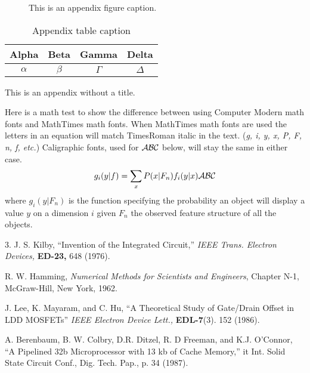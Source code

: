 \documentclass{book}
\begin{document}
\begin{figure}[ht]
\caption{This is an appendix figure caption.}
\end{figure}


\begin{table}[ht]
\caption{Appendix table caption}
\centering
\begin{tabular}{cccc}
\hline
Alpha&Beta&Gamma&Delta\\
\hline
$\alpha$&$\beta$&$\Gamma$&$\Delta$\\
\hline
\end{tabular}
\end{table}


\appendix{}
This is an appendix without a title.

Here is a math test to show the difference between using Computer Modern
math fonts and MathTimes math fonts. When MathTimes math fonts are used
the letters in an equation will match TimesRoman italic in the text.
({\it g, i, y, x, P, F, n, f, etc.}) Caligraphic fonts, used for
$\cal ABC$ below, will stay the same
in either case.
\begin{equation}
g_i(y|f)=\sum_x P(x|F_n)f_i(y|x){\cal ABC}
\end{equation}
where $g_i(y|F_n)$ is the function specifying the probability an object will
display a value $y$ on a dimension $i$ given $F_n$ the observed feature
structure of all the objects.



\begin{references}{3.}
J. S. Kilby,
``Invention of the Integrated Circuit,'' {\it IEEE Trans. Electron Devices,}
{\bf ED-23,} 648 (1976).

R. W. Hamming,
                 {\it Numerical Methods for Scientists and 
                 Engineers}, Chapter N-1, McGraw-Hill, 
                 New York, 1962.

J. Lee, K. Mayaram, and C. Hu, ``A Theoretical
               Study of Gate/Drain Offset in LDD MOSFETs''
                     {\it IEEE Electron Device Lett.,} {\bf EDL-7}(3). 152 
                     (1986).

A. Berenbaum, 
B. W. Colbry, D.R. Ditzel, R. D Freeman, and 
K.J. O'Connor, ``A Pipelined 32b Microprocessor with 13 kb of Cache Memory,''
{it Int. Solid State Circuit Conf., Dig. Tech. Pap.,} p. 34 (1987).
\end{references}
\end{document}
